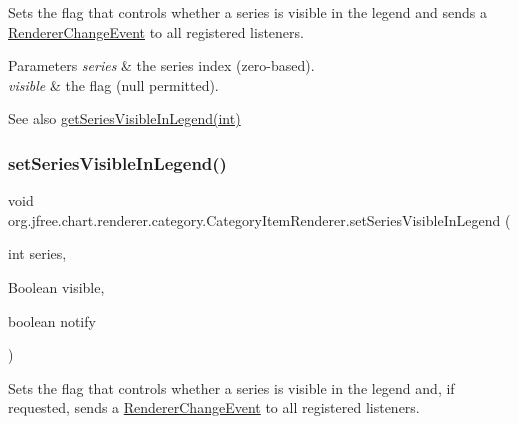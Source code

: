 Sets the flag that controls whether a series is visible in the legend and sends a \mbox{\hyperlink{}{Renderer\+Change\+Event}} to all registered listeners.


\begin{DoxyParams}{Parameters}
{\em series} & the series index (zero-\/based). \\
\hline
{\em visible} & the flag ({\ttfamily null} permitted).\\
\hline
\end{DoxyParams}
\begin{DoxySeeAlso}{See also}
\mbox{\hyperlink{interfaceorg_1_1jfree_1_1chart_1_1renderer_1_1category_1_1_category_item_renderer_aece9d12305e2ae6e3ef96d3981574810}{get\+Series\+Visible\+In\+Legend(int)}} 
\end{DoxySeeAlso}
\mbox{\label{interfaceorg_1_1jfree_1_1chart_1_1renderer_1_1category_1_1_category_item_renderer_a94643e3f2d9e76532894b39b34b80575}} 
\subsubsection{\texorpdfstring{set\+Series\+Visible\+In\+Legend()}{setSeriesVisibleInLegend()}\hspace{0.1cm}{\footnotesize\ttfamily [4/4]}}
{\footnotesize\ttfamily void org.\+jfree.\+chart.\+renderer.\+category.\+Category\+Item\+Renderer.\+set\+Series\+Visible\+In\+Legend (\begin{DoxyParamCaption}\item[{int}]{series,  }\item[{Boolean}]{visible,  }\item[{boolean}]{notify }\end{DoxyParamCaption})}

Sets the flag that controls whether a series is visible in the legend and, if requested, sends a \mbox{\hyperlink{}{Renderer\+Change\+Event}} to all registered listeners.



